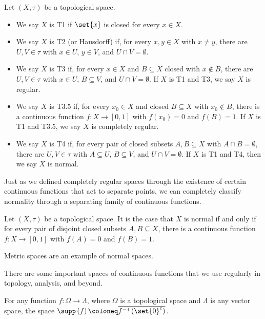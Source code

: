\begin{definition}\label{def:separation_axioms}
Let $\left(X,\tau\right)$ be a topological space.
\begin{itemize}
  \item We say $X$ is T1 if $\set{x}$ is closed for every $x\in X$.
  \item We say $X$ is T2 (or Hausdorff) if, for every $x,y\in X$ with $x\neq y$, there are $U,V\in \tau$ with $x\in U$, $y\in V$, and $U\cap V = \emptyset$.
  \item We say $X$ is T3 if, for every $x\in X$ and $B\subseteq X$ closed with $x\notin B$, there are $U,V\in \tau$ with $x\in U$, $B\subseteq V$, and $U\cap V = \emptyset$. If $X$ is T1 and T3, we say $X$ is regular.
  \item We say $X$ is T3.5 if, for every $x_0\in X$ and closed $B\subseteq X$ with $x_0\notin B$, there is a continuous function $f\colon X\rightarrow [0,1]$ with $f\left(x_0\right) = 0$ and $f\left(B\right) = 1$. If $X$ is T1 and T3.5, we say $X$ is completely regular.
  \item We say $X$ is T4 if, for every pair of closed subsets $A,B\subseteq X$ with $A\cap B = \emptyset$, there are $U,V\in \tau$ with $A\subseteq U$, $B\subseteq V$, and $U\cap V = \emptyset$. If $X$ is T1 and T4, then we say $X$ is normal.
\end{itemize}
\end{definition}
Just as we defined completely regular spaces through the existence of certain continuous functions that act to separate points, we can completely classify normality through a separating family of continuous functions.
\begin{theorem}\label{thm:urysohn_lemma}
  Let $\left(X,\tau\right)$ be a topological space. It is the case that $X$ is normal if and only if for every pair of disjoint closed subsets $A,B\subseteq X$, there is a continuous function $f\colon X\rightarrow [0,1]$ with $f\left(A\right) = 0$ and $f\left(B\right) = 1$.
\end{theorem}
\begin{remark}
  Metric spaces are an example of normal spaces.
\end{remark}
There are some important spaces of continuous functions that we use regularly in topology, analysis, and beyond.
\begin{definition}[Support]\label{def:support}
  For any function $f\colon \Omega\rightarrow \Lambda$, where $\Omega$ is a topological space and $\Lambda$ is any vector space, the space $\supp\left( f \right)\coloneq \overline{f^{-1}\left( \set{0}^{c} \right)}$.
\end{definition}
